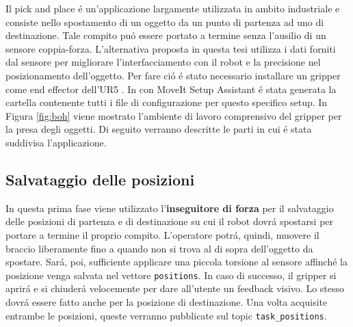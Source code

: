 Il pick and place \'{e} un'applicazione largamente utilizzata in ambito industriale e consiste nello spostamento di un oggetto 
da un punto di partenza ad uno di destinazione. Tale compito pu\'{o} essere portato a termine senza l'ausilio di un sensore 
coppia-forza. L'alternativa proposta in questa tesi utilizza i dati forniti dal sensore per migliorare l'interfacciamento con il robot 
e la precisione nel posizionamento dell'oggetto. Per fare ci\'{o} \'{e} stato necessario installare un gripper come end effector 
dell'UR5 \cite{gripper_repo}. In \cite{environment_setup} con MoveIt Setup Assistant \'{e} stata generata la cartella contenente 
tutti i file di configurazione per questo specifico setup. 
In Figura \ref{fig:boh} viene mostrato l'ambiente di lavoro comprensivo del gripper per la presa degli oggetti. 
Di seguito verranno descritte le parti in cui \'{e} stata suddivisa l'applicazione.
\subsection{Salvataggio delle posizioni} 
In questa prima fase viene utilizzato l'\textbf{inseguitore di forza} per il salvataggio delle posizioni di partenza e di destinazione 
su cui il robot dovr\'{a} spostarsi per portare a termine il proprio compito. 
L'operatore potr\'{a}, quindi, muovere il braccio liberamente fino a quando non si trova al di sopra dell'oggetto da spostare. 
Sar\'{a}, poi, sufficiente applicare una piccola torsione al sensore affinch\'{e} la posizione venga salvata nel vettore 
\verb|positions|. In caso di successo, il gripper si aprir\'{a} e si chiuder\'{a} velocemente per dare all'utente un feedback visivo. 
Lo stesso dovr\'{a} essere fatto anche per la posizione di destinazione. Una volta acquisite entrambe le posizioni, queste 
verranno pubblicate sul topic \verb|task_positions|.
